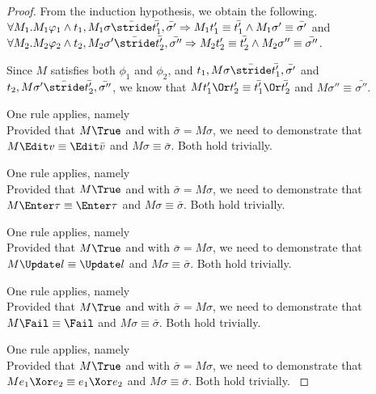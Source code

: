 \begin{proof}
{{    From the induction hypothesis, we obtain the following.\\
    $\forall M_1 . M_1 \phi_1 \land t_1,M_1\sigma \bar{\stride} \bar{t_1'},\bar{\sigma'}\implies M_1 t_1'\equiv\bar{t_1'}\land M_1\sigma' \equiv \bar{\sigma'}$ and \\
    $\forall M_2 . M_2 \phi_2 \land t_2,M_2\sigma' \bar{\stride} \bar{t_2'},\bar{\sigma''}\implies M_2 t_2'\equiv\bar{t_2'}\land M_2\sigma'' \equiv \bar{\sigma''}$.

    Since $M$ satisfies both $\phi_1$ and $\phi_2$, and $t_1,M\sigma \bar{\stride} \bar{t_1'},\bar{\sigma'}$ and $t_2,M\sigma'\bar{\stride}\bar{t_2'},\bar{\sigma''}$,
    we know that $M t_1'\Or t_2'\equiv \bar{t_1'}\Or\bar{t_2'}$ and $M\sigma''\equiv \bar{\sigma''}$.

    }
  }

  {One rule applies, namely \\
  Provided that $M\True$ and  with $\bar{\sigma}=M\sigma$,
  we need to demonstrate that $M\Edit v \equiv \Edit \bar{v}$ and $M\sigma \equiv \bar{\sigma}$.
  Both hold trivially.

  }

  {One rule applies, namely \\
  Provided that $M\True$ and  with $\bar{\sigma}=M\sigma$,
  we need to demonstrate that $M\Enter \tau \equiv \Enter \tau$ and $M\sigma \equiv \bar{\sigma}$.
  Both hold trivially.
  }

  {One rule applies, namely \\
  Provided that $M\True$ and  with $\bar{\sigma}=M\sigma$,
  we need to demonstrate that $M\Update l \equiv \Update l$ and $M\sigma \equiv \bar{\sigma}$.
  Both hold trivially.
  }

  {One rule applies, namely \\
  Provided that $M\True$ and  with $\bar{\sigma}=M\sigma$,
  we need to demonstrate that $M\Fail \equiv \Fail$ and $M\sigma \equiv \bar{\sigma}$.
  Both hold trivially.
  }

  {One rule applies, namely \\
  Provided that $M\True$ and  with $\bar{\sigma}=M\sigma$,
  we need to demonstrate that $M e_1\Xor e_2 \equiv e_1\Xor e_2$ and $M\sigma \equiv \bar{\sigma}$.
  Both hold trivially.
  }


\end{proof}
